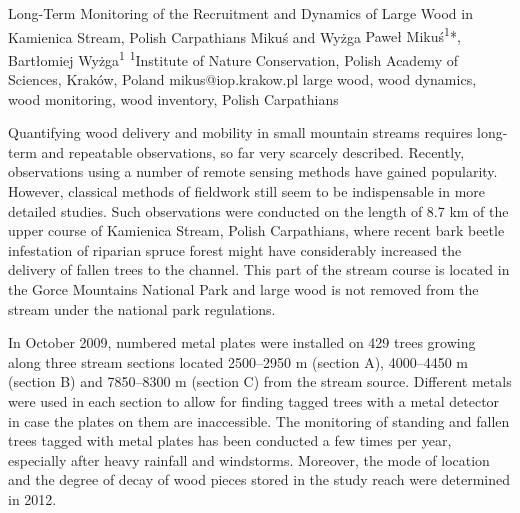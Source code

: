 
\abstract
{Long-Term Monitoring of the Recruitment and Dynamics of Large Wood in Kamienica Stream, Polish Carpathians} %
{Mikuś and Wyżga} %
{Paweł Mikuś\textsuperscript{1}*, Bartłomiej Wyżga\textsuperscript{1}} %
{\TLtag} %
{\textsuperscript{1}Institute of Nature Conservation, Polish Academy of Sciences, Kraków, Poland
} %
{mikus@iop.krakow.pl}  %
{large wood, wood dynamics, wood monitoring, wood inventory, Polish Carpathians}%
{Quantifying wood delivery and mobility in small mountain streams requires long-term and repeatable observations, so far very scarcely described. Recently, observations using a number of remote sensing methods have gained popularity. However, classical methods of fieldwork still seem to be indispensable in more detailed studies. Such observations were conducted on the length of 8.7 km of the upper course of Kamienica Stream, Polish Carpathians, where recent bark beetle infestation of riparian spruce forest might have considerably increased the delivery of fallen trees to the channel. This part of the stream course is located in the Gorce Mountains National Park and large wood is not removed from the stream under the national park regulations.

In October 2009, numbered metal plates were installed on 429 trees growing along three stream sections located 2500–2950 m (section A), 4000–4450 m (section B) and 7850–8300 m (section C) from the stream source. Different metals were used in each section to allow for finding tagged trees with a metal detector in case the plates on them are inaccessible. The monitoring of standing and fallen trees tagged with metal plates has been conducted a few times per year, especially after heavy rainfall and windstorms. Moreover, the mode of location and the degree of decay of wood pieces stored in the study reach were determined in 2012.

}
